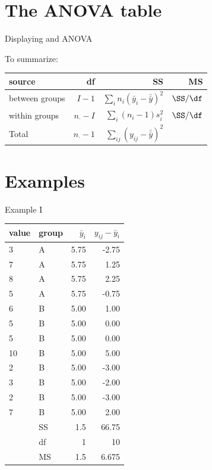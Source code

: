 \section{The ANOVA table}


\begin{frame}{Displaying and ANOVA}

  To summarize:
  \begin{center}
    \begin{tabular}{lrrr}
      source & df & SS & MS \\
      \hline
      between groups & $I-1$ & $\sum_i n_i (\bar y_i - \bar{\bar y})^2$  & $\SS/\df$ \\
      within groups & $n_\cdot -I$ & $\sum_i (n_i -1 )s_i^2$ & $\SS/\df$ \\
      \hline
      Total & $n_\cdot -1$  & $\sum_{ij} (y_{ij}-\bar{\bar y})^2$  & \\
    \end{tabular}
  \end{center}


\end{frame}


\section{Examples}


\begin{frame}{Example I}

\begin{tabular}{ll|rr}
  value & group & $\bar y_i$ & $y_{ij}-\bar y_i$  \\ 
  \hline
3   &  A  &  5.75  &  -2.75      \\
7   &  A  &  5.75  &  1.25       \\
8   &  A  &  5.75  &  2.25       \\
5   &  A  &  5.75  &  -0.75      \\
6   &  B  &  5.00     &  1.00          \\
5   &  B  &  5.00     &  0.00          \\
5   &  B  &  5.00     &  0.00          \\
10  &  B  &  5.00     &  5.00          \\
2   &  B  &  5.00     &  -3.00         \\
3   &  B  &  5.00     &  -2.00         \\
2   &  B  &  5.00     &  -3.00         \\
7   &  B  &  5.00     &  2.00        \\
   \hline
   & SS & 1.5 & 66.75 \\ 
   & df & 1 & 10 \\ 
   & MS & 1.5 & 6.675   \\ 
\end{tabular}

\end{frame}

